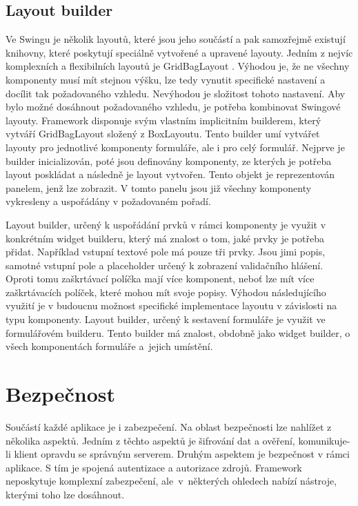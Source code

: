 \subsection{Layout builder}
Ve Swingu je několik layoutů, které jsou jeho součástí a pak samozřejmě existují knihovny, které poskytují speciálně vytvořené a upravené layouty. Jedním z nejvíc komplexních a flexibilních layoutů je GridBagLayout \cite{gridBagLayout}. Výhodou je, že ne všechny komponenty musí mít stejnou výšku, lze tedy vynutit specifické nastavení a docílit tak požadovaného vzhledu. Nevýhodou je složitost tohoto nastavení. Aby bylo možné dosáhnout požadovaného vzhledu, je potřeba kombinovat Swingové layouty. Framework disponuje svým vlastním implicitním builderem, který vytváří GridBagLayout složený z BoxLayoutu. Tento builder umí vytvářet layouty pro jednotlivé komponenty formuláře, ale i pro celý formulář. Nejprve je builder inicializován, poté jsou definovány komponenty, ze kterých je potřeba layout poskládat a následně je layout vytvořen. Tento objekt je reprezentován panelem, jenž lze zobrazit. V tomto panelu jsou již všechny komponenty vykresleny a uspořádány v požadovaném pořadí. 

Layout builder, určený k uspořádání prvků v rámci komponenty je využit v konkrétním widget builderu, který má znalost o tom, jaké prvky je potřeba přidat. Například vstupní textové pole má pouze tři prvky. Jsou jimi popis, samotné vstupní pole a placeholder určený k zobrazení validačního hlášení. Oproti tomu zaškrtávací políčka mají více komponent, neboť lze mít více zaškrtávacích políček, které mohou mít svoje popisy. Výhodou následujícího využití je v budoucnu možnost specifické implementace layoutu v závislosti na typu komponenty. Layout builder, určený k sestavení formuláře je využit ve formulářovém builderu. Tento builder má znalost, obdobně jako widget builder, o všech komponentách formuláře a~jejich umístění. 

\section{Bezpečnost}
Součástí každé aplikace je i zabezpečení. Na oblast bezpečnosti lze nahlížet z několika aspektů. Jedním z těchto aspektů je šifrování dat a ověření, komunikuje-li klient opravdu se správným serverem. Druhým aspektem je bezpečnost v rámci aplikace. S tím je spojená autentizace a autorizace zdrojů. Framework neposkytuje komplexní zabezpečení, ale~v~některých ohledech nabízí nástroje, kterými toho lze dosáhnout.

